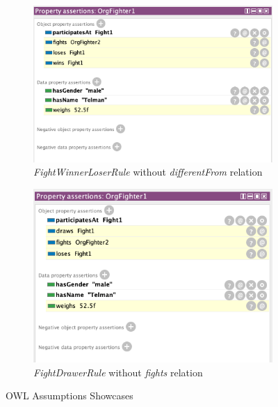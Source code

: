 \documentclass[a4paper]{article}
\begin{document}
\begin{figure}[H]
\centering
\begin{subfigure}{.5\textwidth}
	\centering
	\includegraphics[width=.9\linewidth]{resources/rule_implication_1.png}
	\caption{\textit{FightWinnerLoserRule} without \textit{differentFrom} relation}
	\label{fig:rule_implication_1}
\end{subfigure}%
\begin{subfigure}{.5\textwidth}
	\centering
	\includegraphics[width=.9\linewidth]{resources/rule_implication_2.png}
	\caption{\textit{FightDrawerRule} without \textit{fights} relation}
	\label{fig:rule_implication_2}
\end{subfigure}
\caption{OWL Assumptions Showcases}
\label{fig:rule_implications}
\end{figure}
\end{document}

